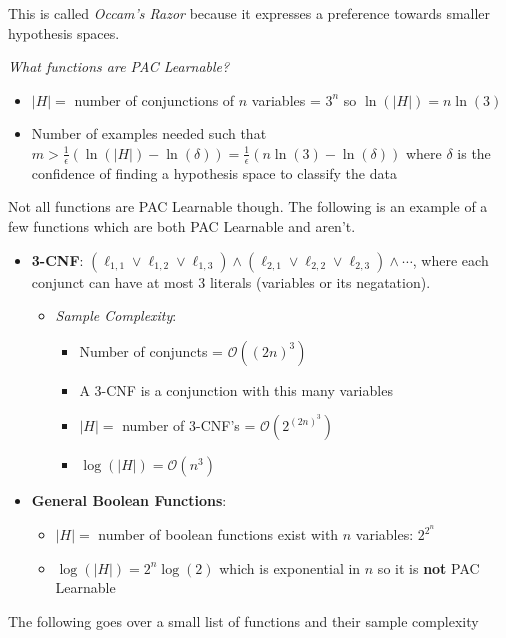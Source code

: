 \documentclass{article}
\newcommand{\abs}[1]{\left| #1\right|}
\newcommand{\BigO}[1]{\mathcal{O}\left( #1\right)}
\begin{document}
This is called {\em Occam's Razor} because it expresses a preference towards smaller hypothesis spaces.

{\em What functions are PAC Learnable?}

\begin{itemize}
\item $\abs{H}=$ number of conjunctions of $n$ variables = $3^{n}$ so $\ln(\abs{H}) = n\ln(3)$
\item Number of examples needed such that $m > \frac{1}{\epsilon}\left(\ln(\abs{H}) - \ln(\delta)\right) = \frac{1}{\epsilon}\left(n\ln(3)-\ln(\delta)\right)$ where $\delta$ is the confidence of finding a hypothesis space to classify the data
\end{itemize}

Not all functions are PAC Learnable though. The following is an example of a few functions which are both PAC Learnable and aren't.

\begin{itemize}
\item {\bf 3-CNF}: $(\ell_{1,1}\vee\ell_{1,2}\vee\ell_{1,3})\wedge(\ell_{2,1}\vee\ell_{2,2}\vee\ell_{2,3})\wedge\cdots$, where each conjunct can have at most 3 literals (variables or its negatation). 
\begin{itemize}
\item {\em Sample Complexity}:
\begin{itemize}
\item Number of conjuncts = $\BigO{(2n)^{3}}$
\item A $3$-CNF is a conjunction with this many variables
\item $\abs{H} = $ number of 3-CNF's = $\BigO{2^{(2n)^{3}}}$
\item $\log(\abs{H}) = \BigO{n^{3}}$
\end{itemize}
\end{itemize}
\item {\bf General Boolean Functions}:
\begin{itemize}
\item $\abs{H} = $ number of boolean functions exist with $n$ variables: $2^{2^{n}}$
\item $\log(\abs{H}) = 2^{n}\log(2)$ which is exponential in $n$ so it is {\bf not} PAC Learnable
\end{itemize}
\end{itemize}

The following goes over a small list of functions and their sample complexity
\end{document}
